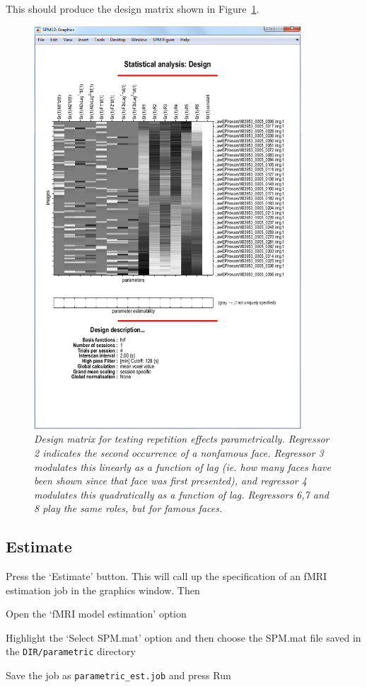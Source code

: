 This should produce the design matrix shown in Figure~\ref{par_design}.

\begin{figure}
\begin{center}
\includegraphics[width=100mm]{faces/par_design}
\caption{\em Design matrix for testing repetition effects parametrically. Regressor 2 indicates the second occurrence of a nonfamous face. Regressor 3 modulates this linearly as a function of lag (ie. how many faces have been shown since that face was first presented), and regressor 4 modulates this quadratically as a function of lag. Regressors 6,7 and 8 play the same roles, but for famous faces. \label{par_design} }
\end{center}
\end{figure}

\subsection{Estimate}

Press the `Estimate' button. This will call up the specification of an fMRI estimation job in the graphics window. Then

\bi
\item{Open the `fMRI model estimation' option}
\item{Highlight the `Select SPM.mat' option and then choose the SPM.mat file saved in the \verb!DIR/parametric! directory}
\item{Save the job as \verb!parametric_est.job! and press Run}
\ei

